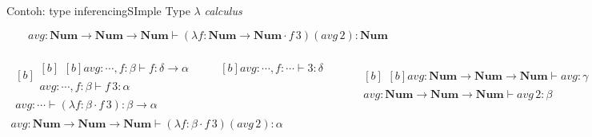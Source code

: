 \documentclass[aspectratio=1610,10pt,handout]{beamer}
\newcommand{\lc}{$\lambda$ {\it calculus}\ }
\begin{document}
\begin{frame}{Contoh: type inferencing}{SImple Type \lc }


\begingroup\small%
\[
\mathit{avg} : \mathbf{Num} \to\mathbf{Num} \to\mathbf{Num} \vdash
(\lambda f : \mathbf{Num} \to \mathbf{Num} \cdot f\,3) (\mathit{avg}\,2)
: \mathbf{Num}
\]
\endgroup%

 \begingroup\tiny%
 \[
 \begin{gathered}
 \begin{gathered}[b]
 \begin{gathered}[b]
 \begin{gathered}[b]
 \hline
 \mathit{avg} : \cdots,
 f : \beta
 \vdash
 f
 :  \delta \to \alpha
 \end{gathered}
 \qquad
 \begin{gathered}[b]
 \hline
 \mathit{avg} : \cdots,
 f : \cdots
 \vdash
 3
 : \delta
 \end{gathered}
 \\
 \hline
 \mathit{avg} : \cdots,
 f : \beta
 \vdash
 f\,3
 : \alpha
 \end{gathered}\\
 \hline
 \mathit{avg} : \cdots
 \vdash
 (\lambda f : \beta \cdot f\,3)
 : \beta \to \alpha
 \end{gathered}
 \qquad
 \begin{gathered}[b]
 \begin{gathered}[b]
 \hline
 \mathit{avg} : \mathbf{Num} \to\mathbf{Num} \to\mathbf{Num} \vdash
 \mathit{avg}
 :  \gamma \to \beta
 \end{gathered}
 \qquad
 \begin{gathered}[b]
 \hline
 \mathit{avg} : \cdots
 \vdash
 2
 : \gamma
 \end{gathered}
 \\
 \hline
 \mathit{avg} :  \mathbf{Num} \to\mathbf{Num} \to\mathbf{Num}
 \vdash
 \mathit{avg}\,2
 : \beta
 \end{gathered}
 \\
 \hline
 \mathit{avg} : \mathbf{Num} \to\mathbf{Num} \to\mathbf{Num} \vdash
 (\lambda f : \beta \cdot f\,3) (\mathit{avg}\,2)
 : \alpha
 \end{gathered}
 \]
 \endgroup%

\end{frame}
\end{document}
